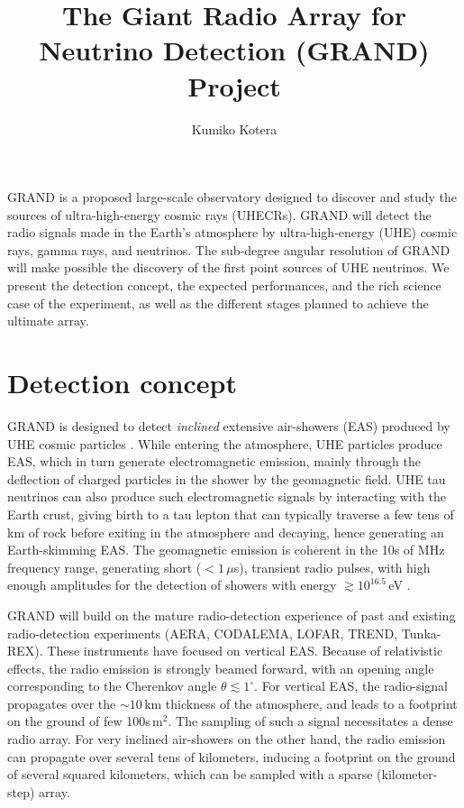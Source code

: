\documentclass[a4paper,11pt]{article}
\title{ The Giant Radio Array for Neutrino Detection (GRAND) Project}
\author*[a,b]{Kumiko Kotera}
\affiliation[a]{Sorbonne Universit\'{e} et CNRS, UMR 7095, Institut d'Astrophysique de Paris, 98 bis bd Arago, 75014 Paris, France}
\affiliation[b]{Vrije Universiteit Brussel (VUB), Dienst ELEM, Pleinlaan 2, B-1050, Brussels, Belgium
}
\begin{document}
\maketitle



GRAND is a proposed large-scale observatory designed to discover and study the sources of ultra-high-energy cosmic rays (UHECRs). GRAND will detect the radio signals made in the Earth's atmosphere by ultra-high-energy (UHE) cosmic rays, gamma rays, and neutrinos. The sub-degree angular resolution of GRAND will make possible the discovery of the first point sources of UHE neutrinos. We present the detection concept, the expected performances, and the rich science case of the experiment, as well as the different stages planned to achieve the ultimate array. 




\section{Detection concept}

GRAND is designed to detect {\it inclined} extensive air-showers (EAS) produced by UHE cosmic particles \cite{GRAND20}. While entering the atmosphere, UHE particles produce EAS, which in turn generate electromagnetic emission, mainly through the deflection of charged particles in the shower by the geomagnetic field. UHE tau neutrinos can also produce such electromagnetic signals by interacting with the Earth crust, giving birth to a tau lepton that can typically traverse a few tens of km of rock before exiting in the atmosphere and decaying, hence generating an Earth-skimming EAS. The geomagnetic emission is coherent in the 10s of MHz frequency range, generating short ($< 1\,\mu$s), transient radio pulses, with high enough amplitudes for the detection of showers with energy $\gtrsim 10^{16.5}\,$eV \cite{Huege:2016veh,SCHRODER20171}. 

GRAND will build on the mature radio-detection experience of past and existing radio-detection experiments (AERA, CODALEMA, LOFAR, TREND, Tunka-REX).
These instruments have focused on vertical EAS. Because of relativistic effects, the
radio emission is strongly beamed forward, with an opening angle corresponding to the Cherenkov
angle $\theta \lesssim 1^\circ$.
For vertical EAS, the radio-signal propagates over the $\sim 10\,$km thickness of the atmosphere, and leads to a footprint on the ground of few 100s\,m$^2$. The sampling of such a signal necessitates a dense radio array. For very inclined air-showers on the other hand, the radio emission can propagate over several tens of kilometers, inducing a footprint on the ground of several squared kilometers, which can be sampled with a sparse (kilometer-step) array. 
\end{document}
